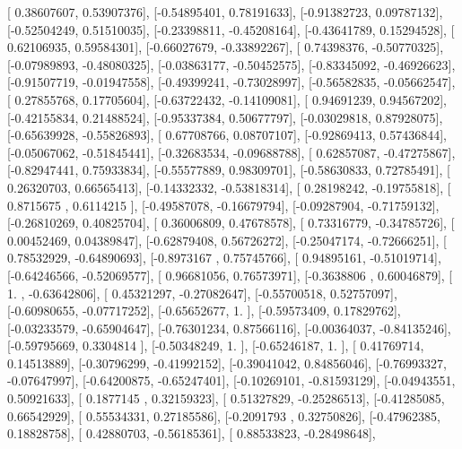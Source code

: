 \documentclass{article}
\begin{document}
       [ 0.38607607,  0.53907376],
       [-0.54895401,  0.78191633],
       [-0.91382723,  0.09787132],
       [-0.52504249,  0.51510035],
       [-0.23398811, -0.45208164],
       [-0.43641789,  0.15294528],
       [ 0.62106935,  0.59584301],
       [-0.66027679, -0.33892267],
       [ 0.74398376, -0.50770325],
       [-0.07989893, -0.48080325],
       [-0.03863177, -0.50452575],
       [-0.83345092, -0.46926623],
       [-0.91507719, -0.01947558],
       [-0.49399241, -0.73028997],
       [-0.56582835, -0.05662547],
       [ 0.27855768,  0.17705604],
       [-0.63722432, -0.14109081],
       [ 0.94691239,  0.94567202],
       [-0.42155834,  0.21488524],
       [-0.95337384,  0.50677797],
       [-0.03029818,  0.87928075],
       [-0.65639928, -0.55826893],
       [ 0.67708766,  0.08707107],
       [-0.92869413,  0.57436844],
       [-0.05067062, -0.51845441],
       [-0.32683534, -0.09688788],
       [ 0.62857087, -0.47275867],
       [-0.82947441,  0.75933834],
       [-0.55577889,  0.98309701],
       [-0.58630833,  0.72785491],
       [ 0.26320703,  0.66565413],
       [-0.14332332, -0.53818314],
       [ 0.28198242, -0.19755818],
       [ 0.8715675 ,  0.6114215 ],
       [-0.49587078, -0.16679794],
       [-0.09287904, -0.71759132],
       [-0.26810269,  0.40825704],
       [ 0.36006809,  0.47678578],
       [ 0.73316779, -0.34785726],
       [ 0.00452469,  0.04389847],
       [-0.62879408,  0.56726272],
       [-0.25047174, -0.72666251],
       [ 0.78532929, -0.64890693],
       [-0.8973167 ,  0.75745766],
       [ 0.94895161, -0.51019714],
       [-0.64246566, -0.52069577],
       [ 0.96681056,  0.76573971],
       [-0.3638806 ,  0.60046879],
       [ 1.        , -0.63642806],
       [ 0.45321297, -0.27082647],
       [-0.55700518,  0.52757097],
       [-0.60980655, -0.07717252],
       [-0.65652677,  1.        ],
       [-0.59573409,  0.17829762],
       [-0.03233579, -0.65904647],
       [-0.76301234,  0.87566116],
       [-0.00364037, -0.84135246],
       [-0.59795669,  0.3304814 ],
       [-0.50348249,  1.        ],
       [-0.65246187,  1.        ],
       [ 0.41769714,  0.14513889],
       [-0.30796299, -0.41992152],
       [-0.39041042,  0.84856046],
       [-0.76993327, -0.07647997],
       [-0.64200875, -0.65247401],
       [-0.10269101, -0.81593129],
       [-0.04943551,  0.50921633],
       [ 0.1877145 ,  0.32159323],
       [ 0.51327829, -0.25286513],
       [-0.41285085,  0.66542929],
       [ 0.55534331,  0.27185586],
       [-0.2091793 ,  0.32750826],
       [-0.47962385,  0.18828758],
       [ 0.42880703, -0.56185361],
       [ 0.88533823, -0.28498648],
\end{document}
